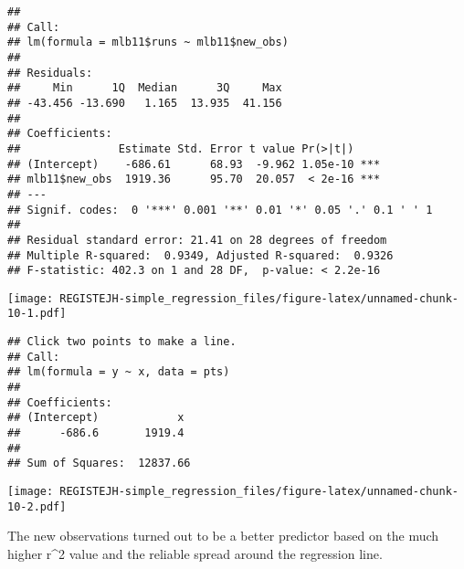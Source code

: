 \documentclass[
]{article}
\newenvironment{Shaded}{\begin{snugshade}}{\end{snugshade}}
\newcommand{\DataTypeTok}[1]{\textcolor[rgb]{0.13,0.29,0.53}{#1}}
\newcommand{\DecValTok}[1]{\textcolor[rgb]{0.00,0.00,0.81}{#1}}
\newcommand{\FloatTok}[1]{\textcolor[rgb]{0.00,0.00,0.81}{#1}}
\newcommand{\KeywordTok}[1]{\textcolor[rgb]{0.13,0.29,0.53}{\textbf{#1}}}
\newcommand{\NormalTok}[1]{#1}
\newcommand{\OperatorTok}[1]{\textcolor[rgb]{0.81,0.36,0.00}{\textbf{#1}}}
\newcommand{\StringTok}[1]{\textcolor[rgb]{0.31,0.60,0.02}{#1}}
\begin{document}
\begin{verbatim}
## 
## Call:
## lm(formula = mlb11$runs ~ mlb11$new_obs)
## 
## Residuals:
##     Min      1Q  Median      3Q     Max 
## -43.456 -13.690   1.165  13.935  41.156 
## 
## Coefficients:
##               Estimate Std. Error t value Pr(>|t|)    
## (Intercept)    -686.61      68.93  -9.962 1.05e-10 ***
## mlb11$new_obs  1919.36      95.70  20.057  < 2e-16 ***
## ---
## Signif. codes:  0 '***' 0.001 '**' 0.01 '*' 0.05 '.' 0.1 ' ' 1
## 
## Residual standard error: 21.41 on 28 degrees of freedom
## Multiple R-squared:  0.9349, Adjusted R-squared:  0.9326 
## F-statistic: 402.3 on 1 and 28 DF,  p-value: < 2.2e-16
\end{verbatim}

\begin{Shaded}
\end{Shaded}

\texttt{[image: REGISTEJH-simple\_regression\_files/figure-latex/unnamed-chunk-10-1.pdf]}

\begin{verbatim}
## Click two points to make a line.                                
## Call:
## lm(formula = y ~ x, data = pts)
## 
## Coefficients:
## (Intercept)            x  
##      -686.6       1919.4  
## 
## Sum of Squares:  12837.66
\end{verbatim}

\begin{Shaded}
\end{Shaded}

\texttt{[image: REGISTEJH-simple\_regression\_files/figure-latex/unnamed-chunk-10-2.pdf]}

The new observations turned out to be a better predictor based on the
much higher r\^{}2 value and the reliable spread around the regression
line.
\end{document}
